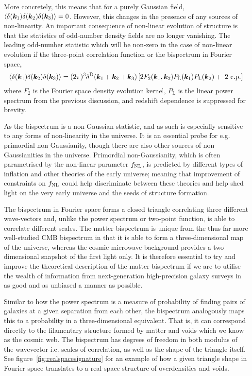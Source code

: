 More concretely, this means that for a purely Gaussian field, $\langle \delta(\bm {k}_1) \delta(\bm {k}_2) \delta(\bm {k}_3)\rangle = 0$. However, this changes in the presence of any sources of non-linearity. An important consequence of non-linear evolution of structure is that the statistics of odd-number density fields are no longer vanishing. The leading odd-number statistic which will be non-zero in the case of non-linear evolution if the three-point correlation function or the bispectrum in Fourier space, 
\begin{equation}
	\langle \delta(\bm {k}_1) \delta(\bm {k}_2) \delta(\bm {k}_3) \rangle = (2 \pi )^3 \delta^\mathrm{D}(\bm {k}_1 + \bm {k}_2 + \bm {k}_3) \left[ 2 F_2(\bm {k}_1,\bm {k}_2) P_\mathrm{L}(\bm {k}_1) P_\mathrm{L}(\bm {k}_2) + \text{ 2 c.p.} \right]
\end{equation}
where $F_2$ is the Fourier space density evolution kernel, $P_\mathrm{L}$ is the linear power spectrum from the previous discussion, and redshift dependence is suppressed for brevity. 

As the bispectrum is a non-Gaussian statistic, and as such is especially sensitive to any forms of non-linearity in the universe. It is an essential probe for e.g. primordial non-Gaussianity, though there are also other sources of non-Gaussianities in the universe. Primordial non-Gaussianity, which is often parametrised by the non-linear parameter $f_\text{NL}$, is predicted by different types of inflation and other theories of the early universe; meaning that improvement of constraints on $f_\text{NL}$ could help discriminate between these theories and help shed light on the very early universe and the seeds of structure formation. 

The bispectrum in Fourier space forms a closed triangle correlating three different wave-vectors and, unlike the power spectrum or two-point function, is able to correlate different scales. The matter bispectrum is unique from the thus far more well-studied CMB bispectrum in that it is able to form a three-dimensional map of the universe, whereas the cosmic microwave background provides a two-dimensional snapshot of the first light only. It is therefore essential to try and improve the theoretical description of the matter bispectrum if we are to utilise the wealth of information from next-generation high-precision galaxy surveys in as good and as unbiased a manner as possible. 

Similar to how the power spectrum is a measure of probability of finding pairs of galaxies at a given separation from each other, the bispectrum analogously maps this to a probability in a three-dimensional equivalent. That is, it can correspond directly to the filamentary structure formed by matter and voids which we know as the cosmic web. The bispectrum has degrees of freedom in both modulus of the wavevector i.e. scales of correlation, as well as the shape of the triangle itself. See figure~\ref{fig:realspacesignature} for an example of how a given triangle shape in Fourier space translates to a real-space structure of overdensities and voids. 

